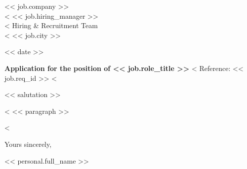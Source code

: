 \documentclass[10pt,a4paper]{article}
\begin{document}

<< job.company >>\\
<%
<< job.hiring_manager >>\\
<%
Hiring \& Recruitment Team\\
<%
<< job.city >>

\vspace{10pt}
<< date >>

\vspace{10pt}
\textbf{Application for the position of << job.role_title >>}
<%
\hfill \small{Reference: << job.req_id >>}
<%

\vspace{8pt}
<< salutation >>

<%
<< paragraph >>

\vspace{4pt}
<%

Yours sincerely,

\vspace{14pt}
<< personal.full_name >>
\end{document}
